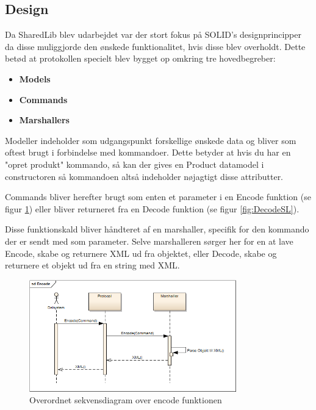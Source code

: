 \subsection{Design}
Da SharedLib blev udarbejdet var der stort fokus på SOLID's designprincipper da disse muliggjorde den ønskede funktionalitet, hvis disse blev overholdt. Dette betød at protokollen specielt blev bygget op omkring tre hovedbegreber:

\begin{itemize}
	\item \textbf{Models}
	\item \textbf{Commands} 
	\item \textbf{Marshallers}
\end{itemize}





Modeller indeholder som udgangspunkt forskellige ønskede data og bliver som oftest brugt i forbindelse med kommandoer. Dette betyder at hvis du har en "opret produkt" kommando, så kan der gives en Product datamodel i constructoren så kommandoen altså indeholder nøjagtigt disse attributter. 

Commands bliver herefter brugt som enten et parameter i en Encode funktion (se figur \ref{fig:EncodeSL}) eller bliver returneret fra en Decode funktion (se figur \ref{fig:DecodeSL}). 

Disse funktionskald bliver håndteret af en marshaller, specifik for den kommando der er sendt med som parameter. Selve marshalleren sørger her for en at lave Encode, skabe og returnere XML ud fra objektet, eller Decode, skabe og returnere et objekt ud fra en string med XML.

\begin{figure}[H]
	\centering
	\includegraphics[width=0.8\textwidth]{Projektbeskrivelse/SharedLib/Images/Rapport/Encode.png}
	\caption{Overordnet sekvensdiagram over encode funktionen}
	\label{fig:EncodeSL}
\end{figure}

